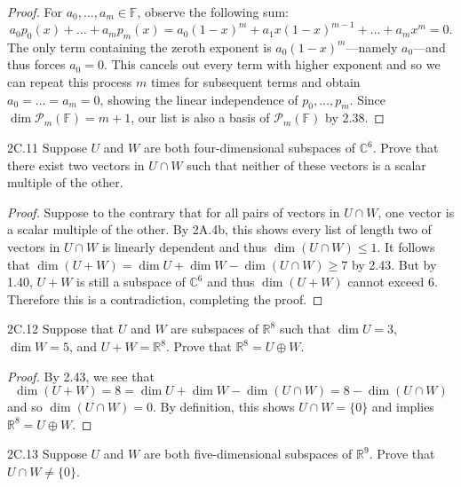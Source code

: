 \documentclass{exam}
\begin{document}
\begin{proof}
    For $a_0, \dots, a_m\in\mathbb F$, observe the following sum: \[
        a_0p_0(x) + \dots + a_mp_m(x) = a_0(1-x)^m + a_1x(1-x)^{m - 1} + \dots + a_mx^m = 0.
    \]
    The only term containing the zeroth exponent is $a_0(1-x)^m$---namely $a_0$---and thus forces $a_0 = 0$. This cancels out every term with higher exponent and so we can repeat this process $m$ times for subsequent terms and obtain $a_0 = \dots = a_m = 0$, showing the linear independence of $p_0, \dots, p_m$. Since $\dim\mathcal P_m(\mathbb F) = m + 1$, our list is also a basis of $\mathcal P_m(\mathbb F)$ by 2.38.
\end{proof}
\begin{problem}{2C.11}
    Suppose $U$ and $W$ are both four-dimensional subspaces of $\mathbb C^6$. Prove that there exist two vectors in $U\cap W$ such that neither of these vectors is a scalar multiple of the other.
\end{problem}

\begin{proof}
    Suppose to the contrary that for all pairs of vectors in $U\cap W$, one vector is a scalar multiple of the other. By 2A.4b, this shows every list of length two of vectors in $U\cap W$ is linearly dependent and thus $\dim(U\cap W) \le 1$. It follows that $\dim(U + W) = \dim U + \dim W - \dim(U\cap W) \ge 7$ by 2.43. But by 1.40, $U + W$ is still a subspace of $\mathbb C^6$ and thus $\dim(U + W)$ cannot exceed $6$. Therefore this is a contradiction, completing the proof.
\end{proof}

\begin{problem}{2C.12}
    Suppose that $U$ and $W$ are subspaces of $\mathbb R^8$ such that $\dim U = 3$, $\dim W = 5$, and $U + W = \mathbb R^8$. Prove that $\mathbb R^8 = U\oplus W$.
\end{problem}

\begin{proof}
    By 2.43, we see that \[
        \dim(U + W) = 8 = \dim U + \dim W - \dim(U\cap W) = 8 - \dim(U\cap W)
    \]
    and so $\dim(U\cap W) = 0$. By definition, this shows $U\cap W = \{0\}$ and implies $\mathbb R^8 = U\oplus W$.
\end{proof}

\begin{problem}{2C.13}
    Suppose $U$ and $W$ are both five-dimensional subspaces of $\mathbb R^9$. Prove that $U\cap W\neq\{0\}$.
\end{problem}
\end{document}
